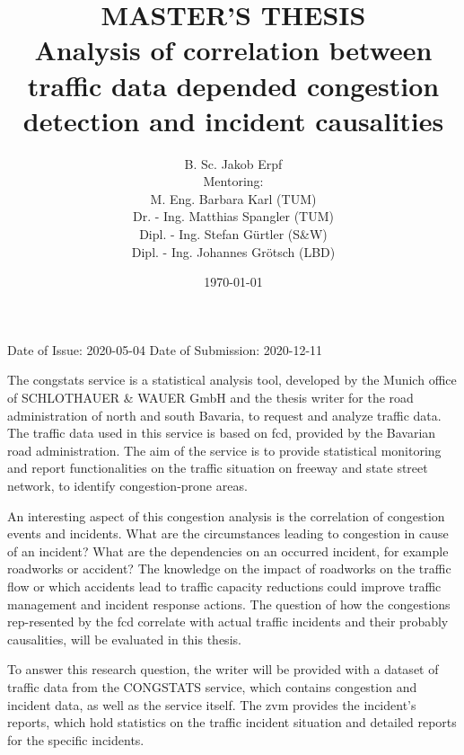 \documentclass[a4paper,12pt]{report}
\begin{document}
\title{MASTER'S THESIS\\
[1cm]
\smaller Analysis of correlation between traffic data depended congestion detection and incident causalities}
\author{
B. Sc. Jakob Erpf\\ 
[1cm]
\small Mentoring:\\ 
\small M. Eng. Barbara Karl (TUM)\\ 
\small Dr. - Ing. Matthias Spangler (TUM)\\ 
\small Dipl. - Ing. Stefan Gürtler (S\&W)\\
\small Dipl. - Ing. Johannes Grötsch (LBD)
}
\date{\today}
\maketitle
\clearpage
\renewcommand\abstractname{Topic}
\abstract{}
Date of Issue: 2020-05-04\newline
Date of Submission:	2020-12-11\newline
\newline
\par The \gls{congstats} service is a statistical analysis tool, developed by the Munich office of SCHLOTHAUER \& WAUER GmbH and the thesis writer for the road administration of north and south Bavaria, to request and analyze traffic data. The traffic data used in this service is based on \acrfull{fcd}, provided by the Bavarian road administration. The aim of the service is to provide statistical monitoring and report functionalities on the traffic situation on freeway and state street network, to identify congestion-prone areas.
\par An interesting aspect of this congestion analysis is the correlation of congestion events and incidents. What are the circumstances leading to congestion in cause of an incident? What are the dependencies on an occurred incident, for example roadworks or accident? The knowledge on the impact of roadworks on the traffic flow or which accidents lead to traffic capacity reductions could improve traffic management and incident response actions. The question of how the congestions rep-resented by the \acrshort{fcd} correlate with actual traffic incidents and their probably causalities, will be evaluated in this thesis. 
\par To answer this research question, the writer will be provided with a dataset of traffic data from the CONGSTATS service, which contains congestion and incident data, as well as the service itself. The \acrfull{zvm} provides the incident’s reports, which hold statistics on the traffic incident situation and detailed reports for the specific incidents.
\end{document}
